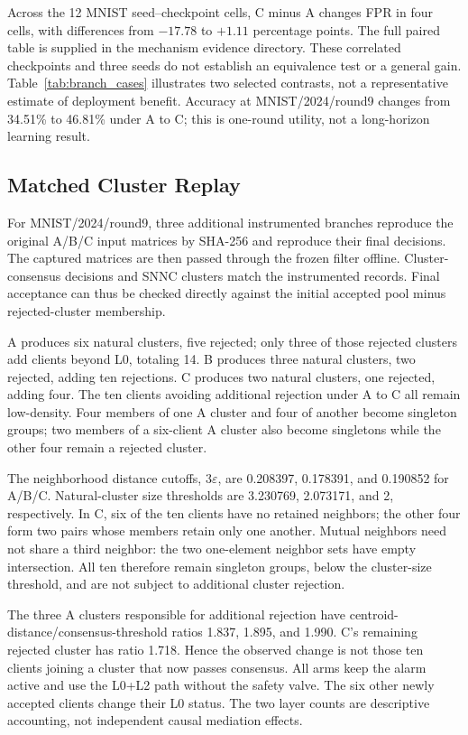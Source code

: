 \documentclass[journal]{IEEEtran}
\begin{document}

Across the 12 MNIST seed--checkpoint cells, C minus A changes FPR in four cells, with differences from $-17.78$ to $+1.11$ percentage points. The full paired table is supplied in the mechanism evidence directory. These correlated checkpoints and three seeds do not establish an equivalence test or a general gain. Table~\ref{tab:branch_cases} illustrates two selected contrasts, not a representative estimate of deployment benefit. Accuracy at MNIST/2024/round9 changes from 34.51\% to 46.81\% under A to C; this is one-round utility, not a long-horizon learning result.

\subsection{Matched Cluster Replay}
For MNIST/2024/round9, three additional instrumented branches reproduce the original A/B/C input matrices by SHA-256 and reproduce their final decisions. The captured matrices are then passed through the frozen filter offline. Cluster-consensus decisions and SNNC clusters match the instrumented records. Final acceptance can thus be checked directly against the initial accepted pool minus rejected-cluster membership.

A produces six natural clusters, five rejected; only three of those rejected clusters add clients beyond L0, totaling 14. B produces three natural clusters, two rejected, adding ten rejections. C produces two natural clusters, one rejected, adding four. The ten clients avoiding additional rejection under A to C all remain low-density. Four members of one A cluster and four of another become singleton groups; two members of a six-client A cluster also become singletons while the other four remain a rejected cluster.

The neighborhood distance cutoffs, $3\varepsilon$, are 0.208397, 0.178391, and 0.190852 for A/B/C. Natural-cluster size thresholds are 3.230769, 2.073171, and 2, respectively. In C, six of the ten clients have no retained neighbors; the other four form two pairs whose members retain only one another. Mutual neighbors need not share a third neighbor: the two one-element neighbor sets have empty intersection. All ten therefore remain singleton groups, below the cluster-size threshold, and are not subject to additional cluster rejection.

The three A clusters responsible for additional rejection have centroid-distance/consensus-threshold ratios 1.837, 1.895, and 1.990. C's remaining rejected cluster has ratio 1.718. Hence the observed change is not those ten clients joining a cluster that now passes consensus. All arms keep the alarm active and use the L0+L2 path without the safety valve. The six other newly accepted clients change their L0 status. The two layer counts are descriptive accounting, not independent causal mediation effects.
\end{document}
